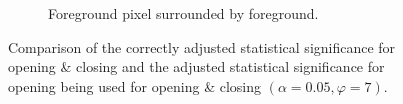\begin{figure}[H]
\begin{subfigure}[t]{0.45\linewidth}
		\caption{Foreground pixel surrounded by foreground.}
		\label{fig: alpha0.05_phi7_foreground_free_test}
	\end{subfigure}
	\caption{Comparison of the correctly adjusted statistical significance for opening \& closing and the adjusted statistical significance for opening being used for opening \& closing $(\alpha = 0.05, \varphi = 7)$.}
	\label{fig: alpha0.05_phi7_test}
\end{figure}
